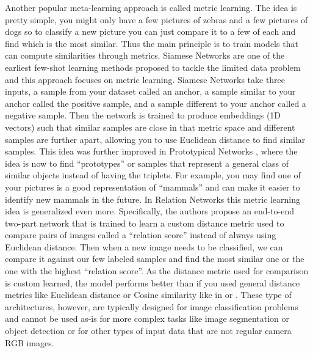 Another popular meta-learning approach is called metric learning. The idea is pretty simple, you might only have a few pictures of zebras and a few pictures of dogs so to classify a new picture you can just compare it to a few of each and find which is the most similar. Thus the main principle is to train models that can compute similarities through metrics. Siamese Networks \cite{Siamese1} are one of the earliest few-shot learning methods proposed to tackle the limited data problem and this approach focuses on metric learning. Siamese Networks take three inputs, a sample from your dataset called an anchor, a sample similar to your anchor called the positive sample, and a sample different to your anchor called a negative sample. Then the network is trained to produce embeddings (1D vectors) such that similar samples are close in that metric space and different samples are further apart, allowing you to use Euclidean distance to find similar samples. This idea was further improved in Prototypical Networks \cite{PrototypicalNetworks}, where the idea is now to find ``prototypes'' or samples that represent a general class of similar objects instead of having the triplets. For example, you may find one of your pictures is a good representation of ``mammals'' and can make it easier to identify new mammals in the future. In Relation Networks \cite{RelationNet} this metric learning idea is generalized even more. Specifically, the authors propose an end-to-end two-part network that is trained to learn a custom distance metric used to compare pairs of images called a ``relation score'' instead of always using Euclidean distance. Then when a new image needs to be classified, we can compare it against our few labeled samples and find the most similar one or the one with the highest ``relation score''. As the distance metric used for comparison is custom learned, the model performs better than if you used general distance metrics like Euclidean distance or Cosine similarity like in \cite{PrototypicalNetworks} or \cite{Siamese1}. These type of architectures, however, are typically designed for image classification problems and cannot be used as-is for more complex tasks like image segmentation or object detection or for other types of input data that are not regular camera RGB images.

